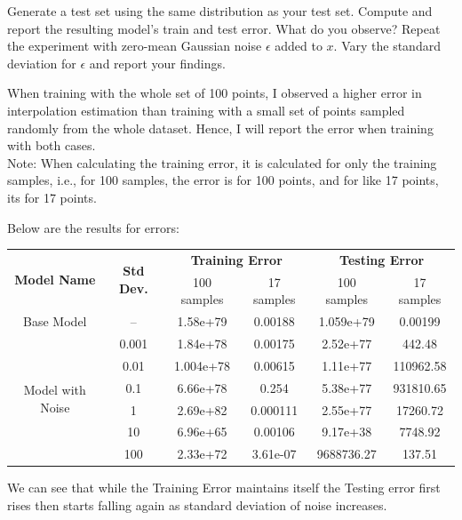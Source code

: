 \documentclass[a4paper]{article}
\theoremstyle{definition}
\newenvironment{soln}{
    \leavevmode\color{blue}\ignorespaces
}{}
\begin{document}
Generate a test set using the same distribution as your test set. Compute and report the resulting model’s train and test error. What do you observe?
Repeat the experiment with zero-mean Gaussian noise $\epsilon$ added to $x$. Vary the standard deviation for $\epsilon$ and report your findings.\\
\begin{soln}
    When training with the whole set of 100 points, I observed a higher error in interpolation estimation than training with a small set of points sampled randomly from the whole dataset. Hence, I will report the error when training with both cases.\\
    Note: When calculating the training error, it is calculated for only the training samples, i.e., for 100 samples, the error is for 100 points, and for like 17 points, its for 17 points.
    
    Below are the results for errors:\\
    \begin{center}
        \begin{tabular}{|c|c|c|c|c|c|}
            \hline
            \multirow{2}{6em}{\textbf{Model Name}} & \multirow{2}{4em}{\textbf{Std Dev.}} & \multicolumn{2}{c|}{\textbf{Training Error}} & \multicolumn{2}{c|}{\textbf{Testing Error}}\\
            & & 100 samples & 17 samples & 100 samples & 17 samples \\
            \hline
            Base Model & -- & 1.58e+79 & 0.00188 & 1.059e+79 & 0.00199 \\
            \multirow{6}{6em}{Model with Noise} & 0.001 & 1.84e+78 & 0.00175 & 2.52e+77 & 442.48 \\
             & 0.01 & 1.004e+78 & 0.00615 & 1.11e+77 & 110962.58 \\
             & 0.1 & 6.66e+78 & 0.254 & 5.38e+77 & 931810.65 \\
             & 1 & 2.69e+82 & 0.000111 & 2.55e+77 & 17260.72 \\
             & 10 & 6.96e+65 & 0.00106 & 9.17e+38 & 7748.92 \\
             & 100 & 2.33e+72 & 3.61e-07 & 9688736.27 & 137.51 \\
            \hline
        \end{tabular}
    \end{center}
    We can see that while the Training Error maintains itself the Testing error first rises then starts falling again as standard deviation of noise increases.
\end{soln}


\end{document}
